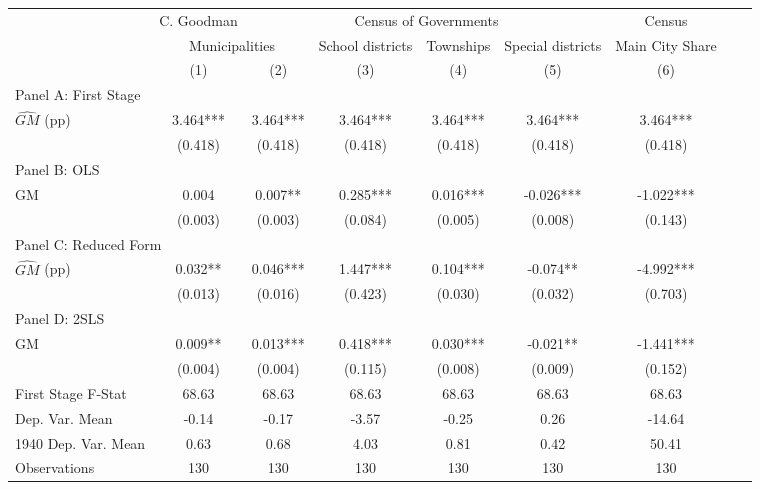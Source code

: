  \begin{tabular}{l*{8}{c}} \toprule
&\multicolumn{1}{c}{C. Goodman}&\multicolumn{4}{c}{Census of Governments}&\multicolumn{1}{c}{Census}\\\cmidrule(lr){2-2}\cmidrule(lr){3-6}\cmidrule(lr){7-7}
&\multicolumn{2}{c}{Municipalities}&\multicolumn{1}{c}{School districts}&\multicolumn{1}{c}{Townships}&\multicolumn{1}{c}{Special districts}&\multicolumn{1}{c}{Main City Share}\\\cmidrule(lr){2-3}\cmidrule(lr){4-6}\cmidrule(lr){7-7}
&\multicolumn{1}{c}{(1)}&\multicolumn{1}{c}{(2)}&\multicolumn{1}{c}{(3)}&\multicolumn{1}{c}{(4)}&\multicolumn{1}{c}{(5)}&\multicolumn{1}{c}{(6)}\\
\cmidrule(lr){1-7}
\multicolumn{6}{l}{Panel A: First Stage}\\
\cmidrule(lr){1-7}
$\widehat{GM}$ (pp)&    3.464***&    3.464***&    3.464***&    3.464***&    3.464***&    3.464***\\
                &  (0.418)   &  (0.418)   &  (0.418)   &  (0.418)   &  (0.418)   &  (0.418)   \\
\cmidrule(lr){1-7}
\multicolumn{6}{l}{Panel B: OLS}\\
\cmidrule(lr){1-7}
GM              &    0.004   &    0.007** &    0.285***&    0.016***&   -0.026***&   -1.022***\\
                &  (0.003)   &  (0.003)   &  (0.084)   &  (0.005)   &  (0.008)   &  (0.143)   \\
\cmidrule(lr){1-7}
\multicolumn{6}{l}{Panel C: Reduced Form}\\
\cmidrule(lr){1-7}
$\widehat{GM}$ (pp)&    0.032** &    0.046***&    1.447***&    0.104***&   -0.074** &   -4.992***\\
                &  (0.013)   &  (0.016)   &  (0.423)   &  (0.030)   &  (0.032)   &  (0.703)   \\
\cmidrule(lr){1-7}
\multicolumn{6}{l}{Panel D: 2SLS}\\
\cmidrule(lr){1-7}
GM              &    0.009** &    0.013***&    0.418***&    0.030***&   -0.021** &   -1.441***\\
                &  (0.004)   &  (0.004)   &  (0.115)   &  (0.008)   &  (0.009)   &  (0.152)   \\
\midrule
First Stage F-Stat&    68.63   &    68.63   &    68.63   &    68.63   &    68.63   &    68.63   \\
Dep. Var. Mean  &    -0.14   &    -0.17   &    -3.57   &    -0.25   &     0.26   &   -14.64   \\
1940 Dep. Var. Mean&     0.63   &     0.68   &     4.03   &     0.81   &     0.42   &    50.41   \\
Observations    &      130   &      130   &      130   &      130   &      130   &      130   \\
 \bottomrule \end{tabular}
